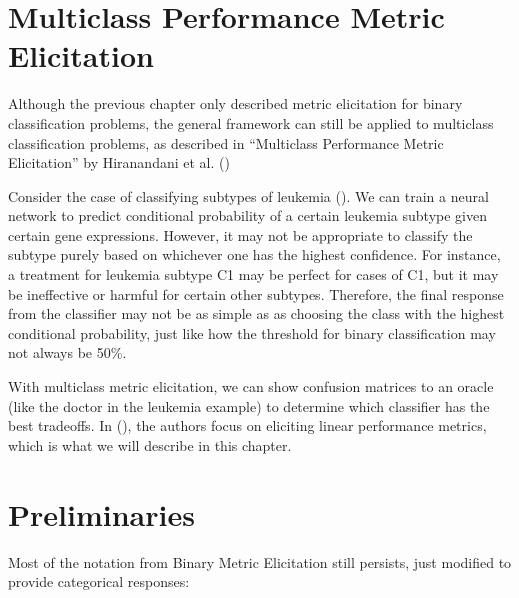 \documentclass[
  letterpaper,
  DIV=11,
  numbers=noendperiod,
  oneside]{scrreprt}
\theoremstyle{remark}
\begin{document}
\section{Multiclass Performance Metric
Elicitation}\label{multiclass-performance-metric-elicitation}

Although the previous chapter only described metric elicitation for
binary classification problems, the general framework can still be
applied to multiclass classification problems, as described in
``Multiclass Performance Metric Elicitation'' by Hiranandani et al.
()

Consider the case of classifying subtypes of leukemia
(). We can
train a neural network to predict conditional probability of a certain
leukemia subtype given certain gene expressions. However, it may not be
appropriate to classify the subtype purely based on whichever one has
the highest confidence. For instance, a treatment for leukemia subtype
C1 may be perfect for cases of C1, but it may be ineffective or harmful
for certain other subtypes. Therefore, the final response from the
classifier may not be as simple as as choosing the class with the
highest conditional probability, just like how the threshold for binary
classification may not always be 50\%.

With multiclass metric elicitation, we can show confusion matrices to an
oracle (like the doctor in the leukemia example) to determine which
classifier has the best tradeoffs. In
(), the
authors focus on eliciting linear performance metrics, which is what we
will describe in this chapter.

\section{Preliminaries}\label{preliminaries}

Most of the notation from Binary Metric Elicitation still persists, just
modified to provide categorical responses:
\end{document}
